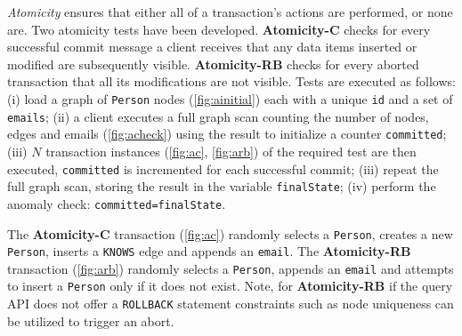 \emph{Atomicity} ensures that either all of a transaction's actions are performed, or none are.
Two atomicity tests have been developed.
\textbf{Atomicity-C} checks for every successful commit message a client receives that any data items inserted or modified are subsequently visible.
\textbf{Atomicity-RB} checks for every aborted transaction that all its modifications are not visible.
%
Tests are executed as follows:
(i) load a graph of \texttt{Person} nodes (\autoref{fig:ainitial}) each with a unique \texttt{id} and a set of \texttt{emails};
(ii) a client executes a full graph scan counting the number of nodes, edges and emails (\autoref{fig:acheck}) using the result to initialize a counter \texttt{committed};
(iii) $N$ transaction instances (\autoref{fig:ac}, \autoref{fig:arb}) of the required test are then executed, \texttt{committed} is incremented for each successful commit;
(iii) repeat the full graph scan, storing the result in the variable \texttt{finalState};
(iv) perform the anomaly check: \texttt{committed=finalState}.

The \textbf{Atomicity-C} transaction (\autoref{fig:ac}) randomly selects a \texttt{Person}, creates a new \texttt{Person}, inserts a \texttt{KNOWS} edge and appends an \texttt{email}. The \textbf{Atomicity-RB} transaction (\autoref{fig:arb}) randomly selects a \texttt{Person}, appends an \texttt{email} and attempts to insert a \texttt{Person} only if it does not exist.
Note, for \textbf{Atomicity-RB} if the query API does not offer a \texttt{ROLLBACK} statement constraints such as node uniqueness can be utilized to trigger an abort.

